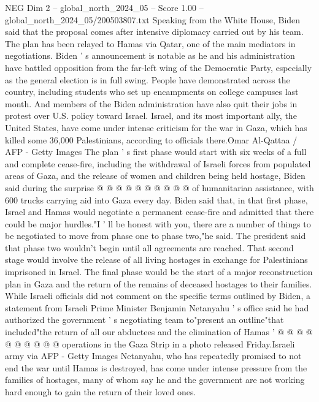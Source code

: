 \begin{textsample}{NEG Dim 2 – global\_north\_2024\_05 – Score 1.00 – global\_north\_2024\_05/200503807.txt}  \label{ex:f2_neg_055}
Speaking from the White House, Biden said that the proposal comes after intensive diplomacy carried out by his team.
The plan has been relayed to Hamas via Qatar, one of the main mediators in negotiations.
Biden ' s announcement is notable as he and his administration have battled opposition from the far-left wing of the Democratic Party, especially as the general election is in full swing.
People have demonstrated across the country, including students who set up encampments on college campuses last month.
And members of the Biden administration have also quit their jobs in protest over U.S. policy toward Israel.
Israel, and its most important ally, the United States, have come under intense criticism for the war in Gaza, which has killed some 36,000 Palestinians, according to officials there.Omar Al-Qattaa / AFP - Getty Images The plan ' s first phase would start with six weeks of a full and complete cease-fire, including the withdrawal of Israeli forces from populated areas of Gaza, and the release of women and children being held hostage, Biden said during the surprise @ @ @ @ @ @ @ @ @ @ of humanitarian assistance, with 600 trucks carrying aid into Gaza every day.
Biden said that, in that first phase, Israel and Hamas would negotiate a permanent cease-fire and admitted that there could be major hurdles."I ' ll be honest with you, there are a number of things to be negotiated to move from phase one to phase two,"he said.
The president said that phase two wouldn't begin until all agreements are reached.
That second stage would involve the release of all living hostages in exchange for Palestinians imprisoned in Israel.
The final phase would be the start of a major reconstruction plan in Gaza and the return of the remains of deceased hostages to their families.
While Israeli officials did not comment on the specific terms outlined by Biden, a statement from Israeli Prime Minister Benjamin Netanyahu ' s office said he had authorized the government ' s negotiating team to"present an outline"that included"the return of all our abductees and the elimination of Hamas ' @ @ @ @ @ @ @ @ @ @ operations in the Gaza Strip in a photo released Friday.Israeli army via AFP - Getty Images Netanyahu, who has repeatedly promised to not end the war until Hamas is destroyed, has come under intense pressure from the families of hostages, many of whom say he and the government are not working hard enough to gain the return of their loved ones.

\end{textsample}
